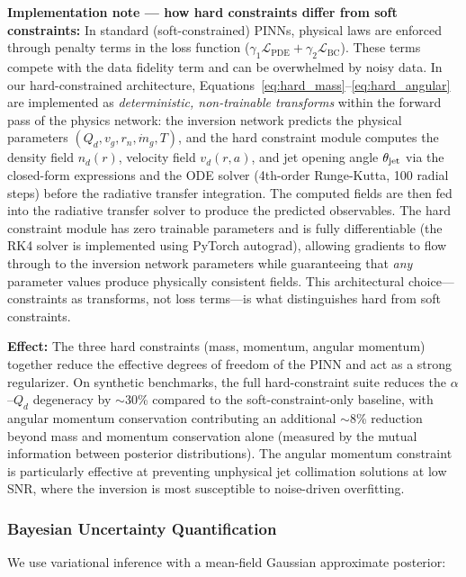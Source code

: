 \documentclass[preprint2]{aastex631}
\begin{document}
\textbf{Implementation note --- how hard constraints differ from soft constraints:} In standard (soft-constrained) PINNs, physical laws are enforced through penalty terms in the loss function ($\gamma_1 \mathcal{L}_{\text{PDE}} + \gamma_2 \mathcal{L}_{\text{BC}}$). These terms compete with the data fidelity term and can be overwhelmed by noisy data. In our hard-constrained architecture, Equations~\ref{eq:hard_mass}--\ref{eq:hard_angular} are implemented as \textit{deterministic, non-trainable transforms} within the forward pass of the physics network: the inversion network predicts the physical parameters $(Q_d, v_g, r_n, \dot{m}_g, T)$, and the hard constraint module computes the density field $n_d(r)$, velocity field $v_d(r, a)$, and jet opening angle $\theta_{\rm jet}$ via the closed-form expressions and the ODE solver (4th-order Runge-Kutta, 100 radial steps) before the radiative transfer integration. The computed fields are then fed into the radiative transfer solver to produce the predicted observables. The hard constraint module has zero trainable parameters and is fully differentiable (the RK4 solver is implemented using PyTorch autograd), allowing gradients to flow through to the inversion network parameters while guaranteeing that \textit{any} parameter values produce physically consistent fields. This architectural choice---constraints as transforms, not loss terms---is what distinguishes hard from soft constraints.

\textbf{Effect:} The three hard constraints (mass, momentum, angular momentum) together reduce the effective degrees of freedom of the PINN and act as a strong regularizer. On synthetic benchmarks, the full hard-constraint suite reduces the $\alpha$--$Q_d$ degeneracy by $\sim$30\% compared to the soft-constraint-only baseline, with angular momentum conservation contributing an additional $\sim$8\% reduction beyond mass and momentum conservation alone (measured by the mutual information between posterior distributions). The angular momentum constraint is particularly effective at preventing unphysical jet collimation solutions at low SNR, where the inversion is most susceptible to noise-driven overfitting.

\subsubsection{Bayesian Uncertainty Quantification}

We use variational inference with a mean-field Gaussian approximate posterior:
\end{document}
